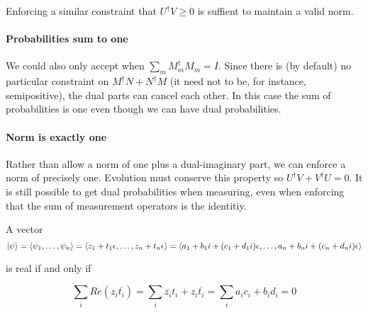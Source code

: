 \documentclass{article}
\newcommand{\e}{\epsilon}
\renewcommand{\bar}{\overline}
\begin{document}
Enforcing a similar constraint that $U^\dagger V \geq 0$ is suffient to maintain a valid norm.

\paragraph{Probabilities sum to one} We could also only accept when $\sum_m M_m^\dagger M_m = I$. Since there is (by default) no particular constraint on $M^\dagger N + N^\dagger M$ (it need not to be, for instance, semipositive), the dual parts can cancel each other. In this case the sum of probabilities is one even though we can have dual probabilities.

\paragraph{Norm is exactly one} Rather than allow a norm of one plus a dual-imaginary part, we can enforce a norm of precisely one.
Evolution must conserve this property so $U^\dagger V + V^\dagger U = 0$.
It is still possible to get dual probabilities when measuring, even when enforcing that the sum of measurement operators is the identitiy.

A vector
\begin{equation}
\ket{\psi} = \braket{\psi_1, \dots, \psi_n} = \braket{z_1 + t_1 \e, \dots, z_n + t_n \e} = \braket{a_1 + b_1i + (c_1 + d_1i)\e, \dots, a_n + b_ni + (c_n + d_ni)\e}
\end{equation}

is real if and only if

\begin{equation}
\sum_i Re(z_i \bar{t_i}) = \sum_i \bar{z_i} t_i + z_i \bar{t_i} = \sum_i a_ic_i + b_id_i = 0
\end{equation}



\end{document}
